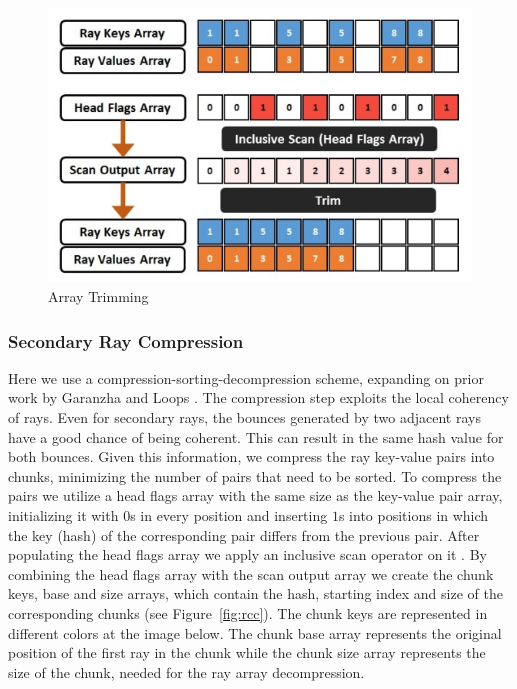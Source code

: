 \documentclass{egpubl}
\begin{document}
\begin{figure}[!htb]
    \centering
    \includegraphics[scale=0.50]{images/array-trimming.jpg}
    \caption{\label{fig:at}Array Trimming}
\end{figure}

\subsubsection{Secondary Ray Compression}

Here we use a compression-sorting-decompression scheme, expanding on prior work by Garanzha and Loops \cite{Garanzha10}. The compression step exploits the local coherency of rays. Even for secondary rays, the bounces generated by two adjacent rays have a good chance of being coherent. This can result in the same hash value for both bounces. Given this information, we compress the ray key-value pairs into chunks, minimizing the number of pairs that need to be sorted. To compress the pairs we utilize a head flags array with the same size as the key-value pair array, initializing it with $0$s in every position and inserting $1$s into positions in which the key (hash) of the corresponding pair differs from the previous pair. After populating the head flags array we apply an inclusive scan operator on it \cite{Merrill09}. By combining the head flags array with the scan output array we create the chunk keys, base and size arrays, which contain the hash, starting index and size of the corresponding chunks (see Figure~\ref{fig:rcc}). The chunk keys are represented in different colors at the image below. The chunk base array represents the original position of the first ray in the chunk while the chunk size array represents the size of the chunk, needed for the ray array decompression.
\end{document}
